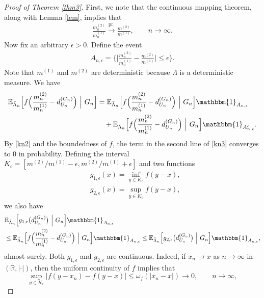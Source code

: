 \documentclass[11pt]{article}
\numberwithin{equation}{section}
\theoremstyle{plain}
\newcommand{\R}{\mathbb R}
\newcommand{\prob}{\overset{\mathrm{pr.}}{\longrightarrow}}
\newcommand{\E}{\mathbb E}
\newcommand{\dn}{d^{(G_{n})}}
\begin{document}
\begin{proof}[Proof of Theorem \ref{thm3}]
First, we note that the continuous mapping theorem, along with Lemma \ref{lem}, implies that
\begin{align}
\label{kn2}
\frac{m_{n}^{(2)}}{m_{n}^{(1)}} \prob \frac{m^{(2)}}{m^{(1)}},\qquad n\to\infty.
\end{align}
Now fix an arbitrary $\epsilon>0$. Define the event 
\begin{align*}
A_{n,\epsilon}=\bigg\{\Big |\frac{m_{n}^{(2)}}{m_{n}^{(1)}}-\frac{m^{(2)}}{m^{(1)}} \Big|\leq \epsilon\bigg\}.
\end{align*}
Note that $m^{(1)}$ and $m^{(2)}$ are deterministic because $\bar{\Lambda}$ is a deterministic measure. We have
\begin{equation}
\label{kn3}
\begin{aligned}
\E_{\bar{\Lambda}_{n}}\Big[f\Big(\frac{m_{n}^{(2)}}{m_{n}^{(1)}}-\dn_{U_n}\Big) ~\Big|~ G_{n}\Big]
&=\E_{\bar{\Lambda}_{n}}\Big[f\Big(\frac{m_{n}^{(2)}}{m_{n}^{(1)}}-\dn_{U_n}\Big) ~\Big|~ G_{n}\Big]
\mathbbm{1}_{A_{n,\epsilon}}\\
&\quad+\E_{\bar{\Lambda}_{n}}\Big[f\Big(\frac{m_{n}^{(2)}}{m_{n}^{(1)}}-\dn_{U_n}\Big) 
~\Big|~ G_{n}\Big]\mathbbm{1}_{A_{n,\epsilon}^{c}}.
\end{aligned}
\end{equation}
By \eqref{kn2} and the boundedness of $f$, the term in the second line of \eqref{kn3} converges to $0$ in probability. Defining the interval $K_{\epsilon} = [m^{(2)}/m^{(1)}-\epsilon,m^{(2)}/m^{(1)}+\epsilon]$ and two functions
\begin{align*}
&g_{1,\epsilon}(x) = \inf_{y\in K_{\epsilon}} f(y-x),\\
&g_{2,\epsilon}(x) = \sup_{y\in K_{\epsilon}} f(y-x),
\end{align*}
we also have
\begin{align}
\label{kn4}
&\E_{\bar{\Lambda}_{n}}\Big[g_{1,\epsilon}\big(\dn_{U_n}\big) ~\Big|~ G_{n}\Big]\mathbbm{1}_{A_{n,\epsilon}} \nonumber\\ 
&\leq \E_{\bar{\Lambda}_{n}}\Big[f\Big(\frac{m_{n}^{(2)}}{m_{n}^{(1)}}-\dn_{U_n}\Big) ~\Big|~ G_{n}\Big] 
\mathbbm{1}_{A_{n,\epsilon}}
\leq \E_{\bar{\Lambda}_{n}}\Big[g_{2,\epsilon}\big(\dn_{U_n}\big) ~\Big|~ G_{n}\Big]\mathbbm{1}_{A_{n,\epsilon}},
\end{align}
almost surely. Both $g_{1,\epsilon}$ and $g_{2,\epsilon}$ are continuous. Indeed,
if $x_n \to x$ as $n\to\infty$ in $(\R ,\vert\cdot\vert)$, then the uniform continuity of $f$ implies that
\[
\sup_{y \in K_{\epsilon}} \big|f(y- x_n) - f(y - x) \big|
\leq \omega_f(|x_n - x|) \to 0,\qquad n\to\infty,
\]
\end{proof}
\end{document}
